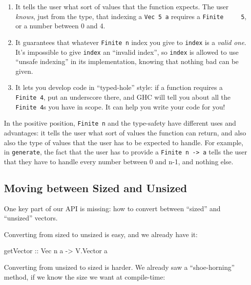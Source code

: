 \documentclass[]{article}
\newenvironment{Shaded}{}{}
\newcommand{\DataTypeTok}[1]{\textcolor[rgb]{0.56,0.13,0.00}{#1}}
\newcommand{\NormalTok}[1]{#1}
\newcommand{\OtherTok}[1]{\textcolor[rgb]{0.00,0.44,0.13}{#1}}
\begin{document}
\begin{enumerate}
\def\labelenumi{\arabic{enumi}.}
\tightlist
\item
  It tells the user what sort of values that the function expects. The user
  \emph{knows}, just from the type, that indexing a \texttt{Vec\ 5\ a} requires
  a \texttt{Finite\ \ \ \ \ 5}, or a number between 0 and 4.
\item
  It guarantees that whatever \texttt{Finite\ n} index you give to
  \texttt{index} is a \emph{valid one}. It's impossible to give \texttt{index}
  an ``invalid index'', so \texttt{index} is allowed to use ``unsafe indexing''
  in its implementation, knowing that nothing bad can be given.
\item
  It lets you develop code in ``typed-hole'' style: if a function requires a
  \texttt{Finite\ 4}, put an underscore there, and GHC will tell you about all
  the \texttt{Finite\ 4}s you have in scope. It can help you write your code for
  you!
\end{enumerate}

In the positive position, \texttt{Finite\ n} and the type-safety have different
uses and advantages: it tells the user what sort of values the function can
return, and also also the type of values that the user has to be expected to
handle. For example, in \texttt{generate}, the fact that the user has to provide
a \texttt{Finite\ n\ -\textgreater{}\ a} tells the user that they have to handle
every number between 0 and n-1, and nothing else.

\subsection{Moving between Sized and
Unsized}\label{moving-between-sized-and-unsized}

One key part of our API is missing: how to convert between ``sized'' and
``unsized'' vectors.

Converting from sized to unsized is easy, and we already have it:

\begin{Shaded}
\begin{Highlighting}[]
\OtherTok{getVector ::} \DataTypeTok{Vec}\NormalTok{ n a }\OtherTok{{-}\textgreater{}} \DataTypeTok{V.Vector}\NormalTok{ a}
\end{Highlighting}
\end{Shaded}

Converting from unsized to sized is harder. We already saw a ``shoe-horning''
method, if we know the size we want at compile-time:
\end{document}
